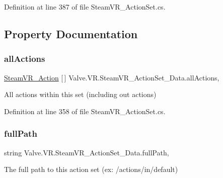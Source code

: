 Definition at line 387 of file Steam\+V\+R\+\_\+\+Action\+Set.\+cs.



\subsection{Property Documentation}
\mbox{\label{class_valve_1_1_v_r_1_1_steam_v_r___action_set___data_a33aa78a713eee29f33de114f12f4ed99}} 
\subsubsection{\texorpdfstring{allActions}{allActions}}
{\footnotesize\ttfamily \mbox{\hyperlink{class_valve_1_1_v_r_1_1_steam_v_r___action}{Steam\+V\+R\+\_\+\+Action}} \mbox{[}$\,$\mbox{]} Valve.\+V\+R.\+Steam\+V\+R\+\_\+\+Action\+Set\+\_\+\+Data.\+all\+Actions\hspace{0.3cm}{\ttfamily [get]}, {\ttfamily [set]}}



All actions within this set (including out actions) 



Definition at line 358 of file Steam\+V\+R\+\_\+\+Action\+Set.\+cs.

\mbox{\label{class_valve_1_1_v_r_1_1_steam_v_r___action_set___data_a4d57b53a9d1c1e38da8f48928d3ca244}} 
\subsubsection{\texorpdfstring{fullPath}{fullPath}}
{\footnotesize\ttfamily string Valve.\+V\+R.\+Steam\+V\+R\+\_\+\+Action\+Set\+\_\+\+Data.\+full\+Path\hspace{0.3cm}{\ttfamily [get]}, {\ttfamily [set]}}



The full path to this action set (ex\+: /actions/in/default) 



